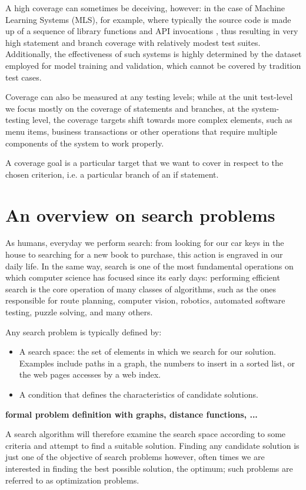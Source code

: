 A high coverage can sometimes be deceiving, however: in the case of Machine Learning Systems (MLS), for example, where typically the source code is made up of a sequence of library functions and API invocations \cite{DBLP:journals/ese/RiccioJSHWT20}, thus resulting in very high statement and branch coverage with relatively modest
test suites. Additionally, the effectiveness of such systems is highly determined by the dataset employed for model training and validation, which cannot be covered by tradition test cases.

Coverage can also be measured at any testing levels; while at the unit test-level we focus mostly on the coverage of statements and branches, at the system-testing level, the coverage targets shift towards more complex elements, such as menu items, business transactions or other operations that require multiple components of the system to work properly.

A coverage goal is a particular target that we want to cover in respect to the chosen criterion, i.e. a particular branch of an if statement.


\section{An overview on search problems}
As humans, everyday we perform search: from looking for our car keys in the house to searching for a new book to purchase, this action is engraved in our daily life.
In the same way, search is one of the most fundamental operations on which computer science has focused since its early days: performing efficient search is the core operation of many classes of algorithms, such as the ones responsible for route planning, computer vision, robotics, automated software testing, puzzle solving, and many others.


Any search problem is typically defined by: 
\begin{itemize}
    \item A search space: the set of elements in which we search for our solution. Examples include paths in a graph, the numbers to insert in a sorted list, or the web pages accesses by a web index.
    \item A condition that defines the characteristics of candidate solutions.
\end{itemize}

\textbf{formal problem definition with graphs, distance functions, ...}

A search algorithm will therefore examine the search space according to some criteria and attempt to find a suitable solution. Finding any candidate solution is just one of the objective of search problems however, often times we are interested in finding the best possible solution, the optimum; such problems are referred to as optimization problems.

